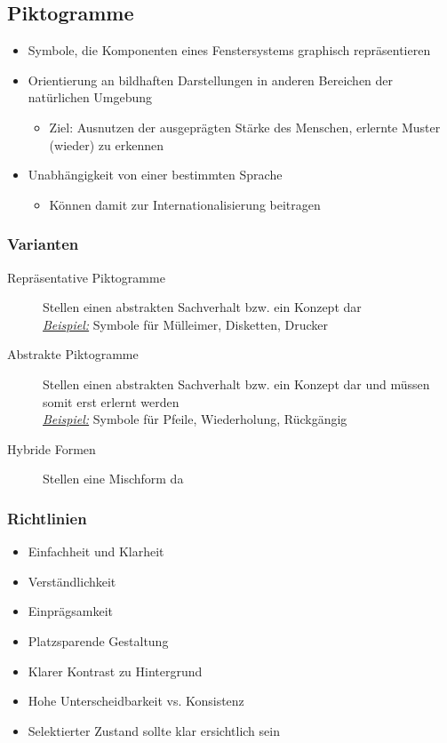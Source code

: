 \documentclass[8pt,a4paper,landscape]{extarticle}
\newcommand{\example}{\textit{\underline{Beispiel:} }}
\begin{document}
\begin{multicols*}{4}
	\subsection{Piktogramme}
	\begin{itemize}
		\item Symbole, die Komponenten eines Fenstersystems graphisch
		      repräsentieren
		\item Orientierung an bildhaften Darstellungen in anderen Bereichen der
		      natürlichen Umgebung
		      \begin{itemize}[nolistsep]
			      \item Ziel: Ausnutzen der ausgeprägten Stärke des Menschen,
			            erlernte Muster (wieder) zu erkennen
		      \end{itemize}
		\item Unabhängigkeit von einer bestimmten Sprache
		      \begin{itemize}[nolistsep]
			      \item Können damit zur Internationalisierung beitragen
		      \end{itemize}
	\end{itemize}
	\subsubsection{Varianten}
	\begin{description}
		\item[Repräsentative Piktogramme] Stellen einen abstrakten Sachverhalt
		      bzw. ein Konzept dar \\
		      \example Symbole für Mülleimer, Disketten, Drucker
		\item[Abstrakte Piktogramme] Stellen einen abstrakten Sachverhalt bzw.
		      ein Konzept dar und müssen somit erst erlernt werden \\
		      \example Symbole für Pfeile, Wiederholung, Rückgängig
		\item[ Hybride Formen] Stellen eine Mischform da
	\end{description}
	\subsubsection{Richtlinien}
	\begin{itemize}
		\item Einfachheit und Klarheit
		\item Verständlichkeit
		\item Einprägsamkeit
		\item Platzsparende Gestaltung
		\item Klarer Kontrast zu Hintergrund
		\item Hohe Unterscheidbarkeit vs. Konsistenz
		\item Selektierter Zustand sollte klar ersichtlich sein
	\end{itemize}

\end{multicols*}
\end{document}

